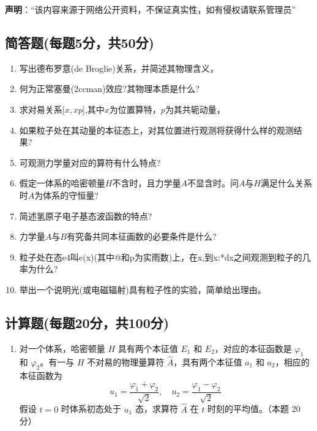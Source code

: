 
\textbf{声明}：“该内容来源于网络公开资料，不保证真实性，如有侵权请联系管理员”

\subsection{简答题(每题5分，共50分)}
\begin{enumerate}
\item 写出德布罗意(de Broglie)关系，并简述其物理含义，
\item 何为正常塞曼(2ccman)效应?其物理本质是什么?
\item 求对易关系[$x,xp$],其中$x$为位置算特，$p$为其共轭动量，
\item 如果粒子处在其动量的本征态上，对其位置进行观测将获得什么样的观测结果?
\item 可观测力学量对应的算符有什么特点?
\item 假定一体系的哈密顿量$H$不含时，且力学量$A$不显含时。问$A$与$H$满足什么关系时$A$为体系的守恒量?
\item 简述氢原子电子基态波函数的特点?
\item 力学量$A$与$B$有究备共同本征画数的必要条件是什么?
\item 粒子处在态e4叫e(x)(其中@和p为实雨数)上，在x,到x:*dx之间观测到粒子的几率为什么?
\item 举出一个说明光(或电磁辐射)具有粒子性的实验，简单给出理由。
\end{enumerate}
\subsection{计算题(每题20分，共100分)}
\begin{enumerate}
\item 对一个体系，哈密顿量 $H$ 具有两个本征值 $E_1$ 和 $E_2$，对应的本征函数是 $\varphi_1$ 和 $\varphi_2$。有一与 $H$ 不对易的物理量算符 $\hat{A}$，具有两个本征值 $a_1$ 和 $a_2$，相应的本征函数为
$$u_1 = \frac{\varphi_1 + \varphi_2}{\sqrt{2}}, \quad u_2 = \frac{\varphi_1 - \varphi_2}{\sqrt{2}}~$$
假设 $t=0$ 时体系初态处于 $u_1$ 态，求算符 $\hat{A}$ 在 $t$ 时刻的平均值。（本题 20 分）
\end{enumerate}

